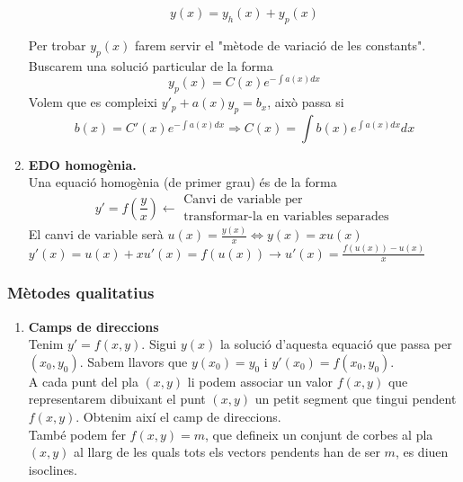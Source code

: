 \documentclass[../main.tex]{subfiles}
\begin{document}
\begin{enumerate}
\begin{corolari}
        \begin{displaymath}
            y(x) = y_h(x) + y_p(x)
        \end{displaymath}
    \end{corolari}
    Per trobar $y_p(x)$ farem servir el "mètode de variació de les constants".
    Buscarem una solució particular de la forma \begin{displaymath}
        y_p(x) = C(x)e^{-\int a(x) dx}
    \end{displaymath}
    Volem que es compleixi $y'_p + a(x)y_p = b_x$, això passa si
    \begin{displaymath}
        b(x) = C'(x)e^{-\int a(x) dx} \Rightarrow C(x) = \int b(x)e^{\int a(x)dx}dx
    \end{displaymath}
    \item \textbf{EDO homogènia.}\\
    Una equació homogènia (de primer grau) és de la forma
    \begin{displaymath}
        y' = f\left(\frac{y}{x}\right) \leftarrow \substack{\text{Canvi de variable per}\\\text{transformar-la en variables separades}}
    \end{displaymath}
    El canvi de variable serà $u(x) = \frac{y(x)}{x} \Leftrightarrow y(x) = xu(x)$\\
    $y'(x) = u(x) + xu'(x) = f(u(x)) \rightarrow u'(x) = \frac{f(u(x))-u(x)}{x}$
\end{enumerate}
\subsubsection{Mètodes qualitatius}
\begin{enumerate}
    \item \textbf{Camps de direccions}\\
    Tenim $y' = f(x,y)$. Sigui $y(x)$ la solució d'aquesta equació que passa per $(x_0, y_0)$. Sabem
    llavors que $y(x_0) = y_0$ i $y'(x_0) = f(x_0, y_0)$.\\
    A cada punt del pla $(x, y)$ li podem associar un valor $f(x,y)$ que representarem dibuixant el
    punt $(x,y)$ un petit segment que tingui pendent $f(x,y)$. Obtenim així el camp de direccions.\\
    També podem fer $f(x,y) = m$, que defineix un conjunt de corbes al pla $(x,y)$ al llarg de les
    quals tots els vectors pendents han de ser $m$, es diuen isoclines.
\end{enumerate}
\end{document}
